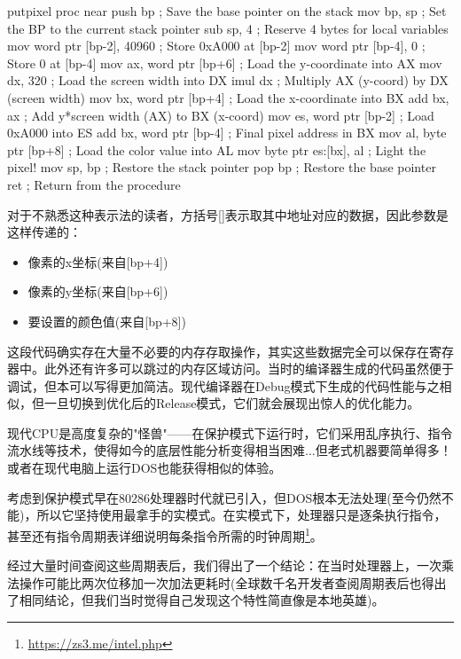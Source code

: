 \begin{shell}
putpixel proc near
  push bp ; Save the base pointer on the stack
  mov bp, sp ; Set the BP to the current stack pointer
  sub sp, 4 ; Reserve 4 bytes for local variables
  mov word ptr [bp-2], 40960 ; Store 0xA000 at [bp-2]
  mov word ptr [bp-4], 0 ; Store 0 at [bp-4]
  mov ax, word ptr [bp+6] ; Load the y-coordinate into AX
  mov dx, 320 ; Load the screen width into DX
  imul dx ; Multiply AX (y-coord) by DX (screen width)
  mov bx, word ptr [bp+4] ; Load the x-coordinate into BX
  add bx, ax ; Add y*screen width (AX) to BX (x-coord)
  mov es, word ptr [bp-2] ; Load 0xA000 into ES
  add bx, word ptr [bp-4] ; Final pixel address in BX
  mov al, byte ptr [bp+8] ; Load the color value into AL
  mov byte ptr es:[bx], al ; Light the pixel!
  mov sp, bp ; Restore the stack pointer
  pop bp ; Restore the base pointer
  ret ; Return from the procedure
\end{shell}

对于不熟悉这种表示法的读者，方括号[]表示取其中地址对应的数据，因此参数是这样传递的：

\begin{itemize}
\item 
像素的x坐标(来自[bp+4])

\item 
像素的y坐标(来自[bp+6]) 

\item 
要设置的颜色值(来自[bp+8])
\end{itemize}

这段代码确实存在大量不必要的内存存取操作，其实这些数据完全可以保存在寄存器中。此外还有许多可以跳过的内存区域访问。当时的编译器生成的代码虽然便于调试，但本可以写得更加简洁。现代编译器在Debug模式下生成的代码性能与之相似，但一旦切换到优化后的Release模式，它们就会展现出惊人的优化能力。

现代CPU是高度复杂的"怪兽"——在保护模式下运行时，它们采用乱序执行、指令流水线等技术，使得如今的底层性能分析变得相当困难...但老式机器要简单得多！或者在现代电脑上运行DOS也能获得相似的体验。

考虑到保护模式早在80286处理器时代就已引入，但DOS根本无法处理(至今仍然不能)，所以它坚持使用最拿手的实模式。在实模式下，处理器只是逐条执行指令，甚至还有指令周期表详细说明每条指令所需的时钟周期\footnote{\url{https://zs3.me/intel.php}}。

经过大量时间查阅这些周期表后，我们得出了一个结论：在当时处理器上，一次乘法操作可能比两次位移加一次加法更耗时(全球数千名开发者查阅周期表后也得出了相同结论，但我们当时觉得自己发现这个特性简直像是本地英雄)。


